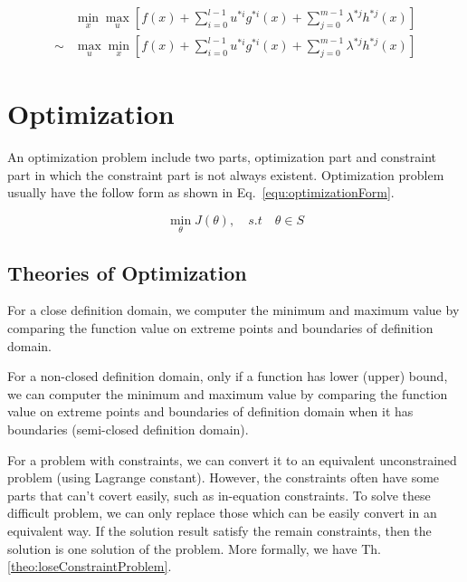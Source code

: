 \documentclass[runningheads,openany]{xhlPaper}
\begin{document}
\begin{equation}
\label{equ:kttDualEquivalent}
\begin{aligned}
&\mathop {\min }\limits_x \mathop {\max }\limits_u \left[ {f\left( x \right) + \sum\limits_{i = 0}^{l - 1} {{u^{*i}}{g^{*i}}\left( x \right)}  + \sum\limits_{j = 0}^{m - 1} {{\lambda ^{*j}}{h^{*j}}\left( x \right)} } \right]\\
 \sim &\mathop {\max }\limits_u \mathop {\min }\limits_x \left[ {f\left( x \right) + \sum\limits_{i = 0}^{l - 1} {{u^{*i}}{g^{*i}}\left( x \right)}  + \sum\limits_{j = 0}^{m - 1} {{\lambda ^{*j}}{h^{*j}}\left( x \right)} } \right]
\end{aligned}
\end{equation}

\section{Optimization}
An optimization problem include two parts, optimization part and constraint part in which the constraint part is not always existent. Optimization problem usually have the follow form as shown in Eq.~\ref{equ:optimizationForm}.

\begin{equation}
\label{equ:optimizationForm}
\mathop {\min }\limits_\theta  J\left( \theta  \right),\quad s.t \quad \theta \in S
\end{equation}

\subsection{Theories of Optimization}
\begin{theorem}
\label{theo:maxminOptimization}
For a close definition domain, we computer the minimum and maximum value by comparing the function value on extreme points and boundaries of definition domain.

For a non-closed definition domain, only if a function has lower (upper) bound, we can computer the minimum and maximum value by comparing the function value on extreme points and boundaries of definition domain when it has boundaries (semi-closed definition domain).   
\end{theorem}

For a problem with constraints, we can convert it to an equivalent unconstrained problem (using Lagrange constant). However, the constraints often have some parts that can't covert easily, such as in-equation constraints. To solve these difficult problem, we can only replace those which can be easily convert in an equivalent way. If the solution result satisfy the remain constraints, then the solution is one solution of the problem. More formally, we have Th.\ref{theo:loseConstraintProblem}.
\end{document}
